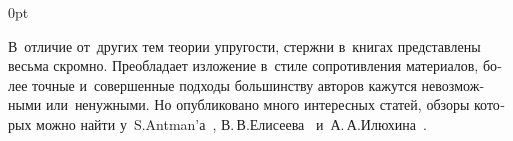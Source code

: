 \begin{changemargin}{\parindent}{0pt}
\fontsize{10}{12}\selectfont

\begin{otherlanguage}{russian}

В~отличие от~других тем теории упругости, стержни в~книгах представлены весьма скромно.
Преобладает изложение в~стиле сопротивления материалов, более точные и~совершенные подходы большинству авторов кажутся невозможными или~ненужными.
Но опубликовано много интересных статей, обзоры которых можно найти у~S.\:Antman’а~\cite{stuartantman-theoryofrods}, В.\,В.\;Елисеева~\cite{eliseev-models} и~А.\,А.\;Илюхина~\cite{ilyuhin-elasticrods}.

\end{otherlanguage}

\end{changemargin}
